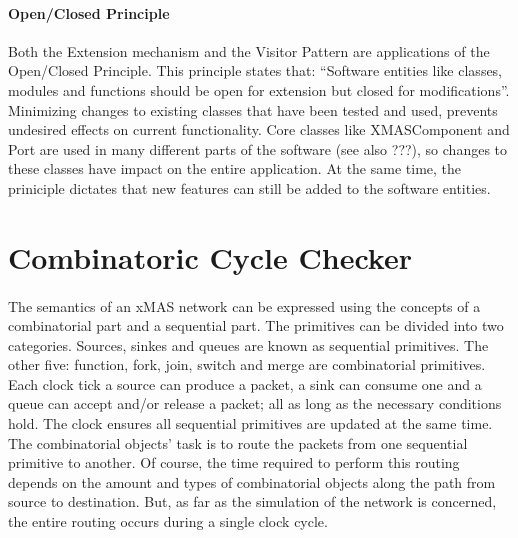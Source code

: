 \documentclass[a4paper,11pt]{article}
\begin{document}
\paragraph{Open/Closed Principle}
Both the Extension mechanism and the Visitor Pattern are applications of the Open/Closed
Principle. This principle states that: ``Software entities like classes, modules and functions
should be open for extension but closed for modifications''\cite{oodesign-open-close}. Minimizing
changes to existing classes that have been tested and used, prevents undesired effects
on current functionality. Core classes like XMASComponent and Port are used in many different parts
of the software (see also ???), so changes to these classes have impact on the entire application.
At the same time, the priniciple dictates that new features can still be added to the software entities.


\section{Combinatoric Cycle Checker}

\paragraph{}
The semantics of an xMAS network can be expressed using the concepts of a combinatorial part and
a sequential part\cite{analyse-tool-11}. The primitives can be divided into two categories.
Sources, sinkes and queues are known as sequential primitives. The other five: function,
fork, join, switch and merge are combinatorial primitives.\\
Each clock tick a source can produce a packet, a sink can consume one and a queue can accept
and/or release a packet; all as long as the necessary conditions hold. The clock ensures
all sequential primitives are updated at the same time.\\
The combinatorial objects' task is to route the packets from one sequential primitive to another.
Of course, the time required to perform this routing depends on the amount and types of
combinatorial objects along the path from source to destination. But, as far as the simulation of
the network is concerned, the entire routing occurs during a single clock cycle.\\
\end{document}

